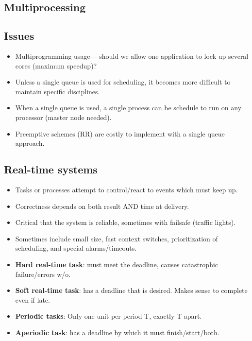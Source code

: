 \documentclass[fontsize=5pt]{scrartcl}
\begin{document}
\begin{multicols}{3}
  \section{Multiprocessing}
    \subsection{Issues}
      \begin{itemize}
        \item Multiprogramming usage--- should we allow one application to lock up several cores (maximum speedup)?
        \item Unless a single queue is used for scheduling, it becomes more difficult to maintain specific disciplines.
        \item When a single queue is used, a single process can be schedule to run on any processor (master node needed).
        \item Preemptive schemes (RR) are costly to implement with a single queue approach.
      \end{itemize}
     \subsection{Real-time systems}
       \begin{itemize}
         \item Tasks or processes attempt to control/react to events which must keep up.
         \item Correctness depends on both result AND time at delivery.
         \item Critical that the system is reliable, sometimes with failsafe (traffic lights).
         \item Sometimes include small size, fast context switches, prioritization of scheduling, and special alarms/timeouts.
         \item \textbf{Hard real-time task}: must meet the deadline, causes catastrophic failure/errors w/o.
         \item \textbf{Soft real-time task}: has a deadline that is desired. Makes sense to complete even if late.
         \item \textbf{Periodic tasks}: Only one unit per period T, exactly T apart.
         \item \textbf{Aperiodic task}: has a deadline by which it must finish/start/both.
       \end{itemize}

\end{multicols}
\end{document}
